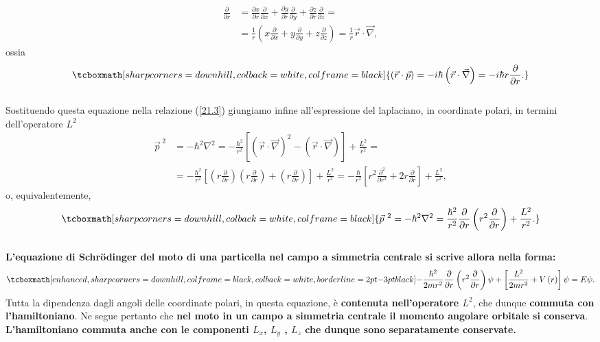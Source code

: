 \documentclass[a4paper,12pt,oneside]{book}
\begin{document}
	\begin{align} 
		\frac{\partial}{\partial r}&= \frac{\partial x}{\partial r} \frac{\partial}{\partial x}+\frac{\partial y}{\partial r} \frac{\partial}{\partial y}+\frac{\partial z}{\partial r} \frac{\partial}{\partial z}= \nonumber \\
		&=  \frac{1}{r}\left(x\frac{\partial}{\partial x}+y\frac{\partial}{\partial y}+z\frac{\partial}{\partial z}\right)=\frac{1}{r}\vec{r}\cdot\vec{\nabla} ,
	\end{align}
ossia
	\begin{equation}
		\tcboxmath[sharp corners=downhill, colback=white, colframe=black]{
			\left(\vec{r}\cdot\vec{p}\right)=-i\hbar\left(\vec{r}\cdot\vec{\nabla}\right)=-i\hbar r \frac{\partial}{\partial r} .
			}
	\end{equation}\\
	
Sostituendo questa equazione nella relazione (\ref{21.3}) giungiamo infine all'espressione del laplaciano, in coordinate polari, in termini dell'operatore $L^2$
	\begin{align}
		\vec{p}^{\ 2}&= -\hbar^2\nabla^2= -\frac{\hbar ^2}{r^2}\left[ \left( \vec{r}\cdot \vec{\nabla} \right) ^2 - \left( \vec{r}\cdot \vec{\nabla} \right)\right] +\frac{L^2}{r^2} = \nonumber \\
		&= -\frac{\hbar^2}{r^2}\left[\left(r\frac{\partial}{\partial r}\right)\left(r\frac{\partial}{\partial r}\right)+\left(r\frac{\partial}{\partial r}\right)\right]+\frac{L^2}{r^2}= -\frac{\hbar}{r^2}\left[r^2\frac{\partial^2}{\partial r^2}+2r\frac{\partial}{\partial r}\right]+\frac{L^2}{r^2} ,
	\end{align}
o, equivalentemente,
	\begin{equation}
		\tcboxmath[sharp corners=downhill, colback=white, colframe=black]{
			\vec{p}^{\ 2}=-\hbar^2\nabla^2=\frac{\hbar^2}{r^2}\frac{\partial}{\partial r}\left(r^2 \frac{\partial}{\partial r}\right)+\frac{L^2}{r^2} .
			}
	\end{equation}\\
	
\textbf{L'equazione di Schr\"{o}dinger del moto di una particella nel campo a simmetria centrale si scrive allora nella forma:}
	\begin{equation}
		\tcboxmath[enhanced, sharp corners=downhill, colframe=black, colback=white, borderline={2pt}{-3pt}{black}]{
			-\frac{\hbar^2}{2mr^2}\frac{\partial}{\partial r}\left(r^2\frac{\partial}{\partial r}\right)\psi+\left[\frac{L^2}{2mr^2}+V\left(r\right)\right]\psi=E\psi .
			}
	\end{equation}
Tutta la dipendenza dagli angoli delle coordinate polari, in questa equazione, è \textbf{contenuta nell'operatore $L^2$}, che dunque \textbf{commuta con l'hamiltoniano}. Ne segue pertanto che\textbf{ nel moto in un campo a simmetria centrale il momento angolare orbitale si conserva}. \textbf{L'hamiltoniano commuta anche con le componenti $L_x$, $L_y$ , $L_z$ che dunque sono separatamente conservate.}\\
\end{document}
